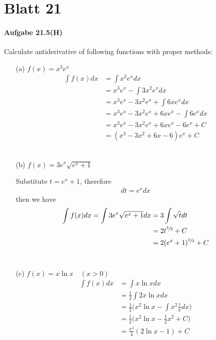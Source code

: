 \section*{Blatt 21}

\newpage

\paragraph{Aufgabe 21.5(H)}

Calculate antiderivative of following functions with proper methods:

\begin{enumerate}

\item[(a)]$f(x)=x^3e^x$
\begin{align}
\int f(x)dx
&=\int x^3e^x dx \\
&=x^3e^x-\int 3x^2e^x dx \\
&=x^3e^x-3x^2e^x+\int 6xe^x dx \\
&=x^3e^x-3x^2e^x+6xe^x-\int 6e^x dx \\
&=x^3e^x-3x^2e^x+6xe^x-6e^x+C \\
&=(x^3-3x^2+6x-6)e^x+C
\end{align}\\

\item[(b)]$f(x)=3e^x\sqrt{e^x+1}$

Substitute $t=e^x+1$, therefore
\begin{align}
dt=e^xdx
\end{align}
then we have
\begin{align}
\int f(x)dx=\int 3e^x\sqrt{e^x+1}dx
&=3\int \sqrt{t}dt \\
&=2t^{\sfrac{3}{2}}+C \\
&=2(e^x+1)^{\sfrac{3}{2}}+C
\end{align}
\\

\item[(c)]$f(x)=x\ln x \hspace{1em} (x>0)$
\begin{align}
\int f(x)dx
&=\int x\ln x dx \\
&=\frac{1}{2} \int 2x\ln x dx \\
&=\frac{1}{2}\bigg(x^2\ln x-\int x^2\frac{1}{x}dx\bigg) \\
&=\frac{1}{2}\bigg(x^2\ln x-\frac{1}{2}x^2+C\bigg) \\
&=\frac{x^2}{4}(2\ln x-1)+C
\end{align}


\end{enumerate}
